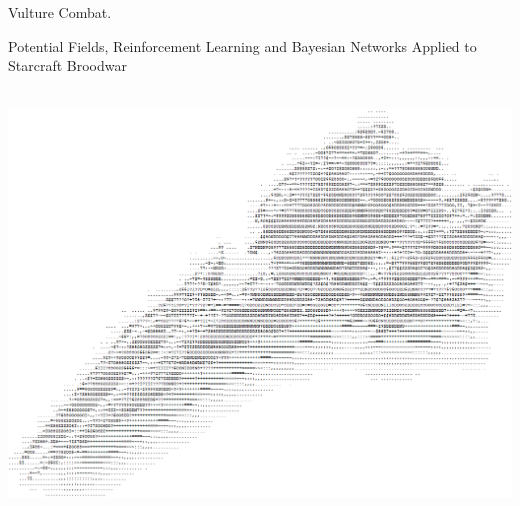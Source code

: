 \thispagestyle{empty}
\begin{center}
	\Huge
	Vulture Combat.
	
	\Large
	Potential Fields, Reinforcement Learning and Bayesian Networks Applied to Starcraft Broodwar
	
	\vspace*{1.5in}~\\
	\hspace*{-1in}
    \includegraphics[scale=0.60]{Figures/FrontPage/FrontPage.png}
			
\end{center}



